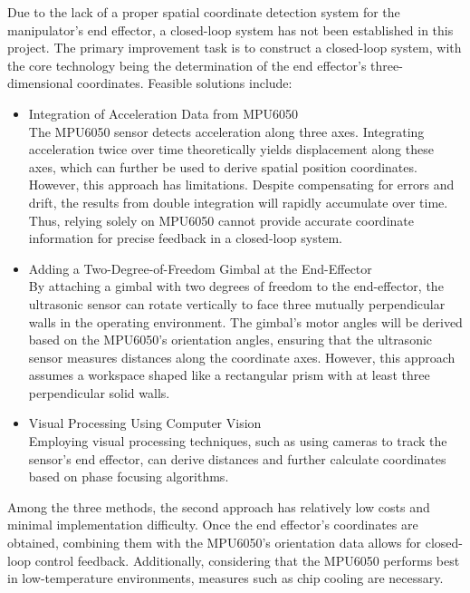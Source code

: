 Due to the lack of a proper spatial coordinate detection system for the manipulator’s end effector, a closed-loop system has not 
been established in this project. The primary improvement task is to construct a closed-loop system, with the core technology 
being the determination of the end effector’s three-dimensional coordinates. Feasible solutions include:
\begin{itemize}
    \item Integration of Acceleration Data from MPU6050 \\
    The MPU6050 sensor detects acceleration along three axes. Integrating acceleration twice over time theoretically yields 
    displacement along these axes, which can further be used to derive spatial position coordinates. However, this approach 
    has limitations. Despite compensating for errors and drift, the results from double integration will rapidly accumulate 
    over time. Thus, relying solely on MPU6050 cannot provide accurate coordinate information for precise feedback in a 
    closed-loop system.
    \item Adding a Two-Degree-of-Freedom Gimbal at the End-Effector \\
    By attaching a gimbal with two degrees of freedom to the end-effector, the ultrasonic sensor can rotate vertically to face 
    three mutually perpendicular walls in the operating environment. The gimbal’s motor angles will be derived based on the 
    MPU6050’s orientation angles, ensuring that the ultrasonic sensor measures distances along the coordinate axes. However, 
    this approach assumes a workspace shaped like a rectangular prism with at least three perpendicular solid walls.
    \item Visual Processing Using Computer Vision \\
    Employing visual processing techniques, such as using cameras to track the sensor’s end effector, can derive distances 
    and further calculate coordinates based on phase focusing algorithms.
\end{itemize}

Among the three methods, the second approach has relatively low costs and minimal implementation difficulty. Once the 
end effector’s coordinates are obtained, combining them with the MPU6050’s orientation data allows for closed-loop control 
feedback. Additionally, considering that the MPU6050 performs best in low-temperature environments, measures such as 
chip cooling are necessary.

\newpage